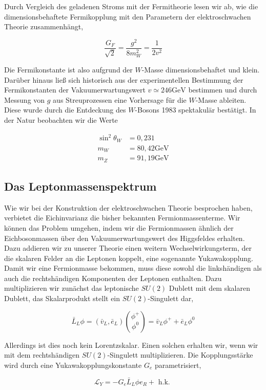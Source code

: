 \documentclass[10pt, letterpaper]{article}
\begin{document}
Durch Vergleich des geladenen Stroms mit der Fermitheorie lesen wir ab, wie die dimensionsbehaftete Fermikopplung mit den Parametern der elektroschwachen Theorie zusammenhängt,

$$
\frac{G_{F}}{\sqrt{2}}=\frac{g^{2}}{8 m_{W}^{2}}=\frac{1}{2 v^{2}}
$$

Die Fermikonstante ist also aufgrund der $W$-Masse dimensionsbehaftet und klein. Darüber hinaus ließ sich historisch aus der experimentellen Bestimmung der Fermikonstanten der Vakuumerwartungswert $v \simeq 246 \mathrm{GeV}$ bestimmen und durch Messung von $g$ aus Streuprozessen eine Vorhersage für die $W$-Masse ableiten. Diese wurde durch die Entdeckung des $W$-Bosons 1983 spektakulär bestätigt. In der Natur beobachten wir die Werte

$$
\begin{aligned}
\sin ^{2} \theta_{W} & =0,231 \\
m_{W} & =80,42 \mathrm{GeV} \\
m_{Z} & =91,19 \mathrm{GeV}
\end{aligned}
$$

\subsection*{Das Leptonmassenspektrum}
Wie wir bei der Konstruktion der elektroschwachen Theorie besprochen haben, verbietet die Eichinvarianz die bisher bekannten Fermionmassenterme. Wir können das Problem umgehen, indem wir die Fermionmassen ähnlich der Eichbosonmassen über den Vakuumerwartungswert des Higgsfeldes erhalten. Dazu addieren wir zu unserer Theorie einen weitern Wechselwirkungsterm, der die skalaren Felder an die Leptonen koppelt, eine sogenannte Yukawakopplung. Damit wir eine Fermionmasse bekommen, muss diese sowohl die linkshändigen als auch die rechtshändigen Komponenten der Leptonen enthalten. Dazu multiplizieren wir zunächst das leptonische $S U(2)$ Dublett mit dem skalaren Dublett, das Skalarprodukt stellt ein $S U(2)$-Singulett dar,

$$
\bar{L}_{L} \phi=\left(\bar{v}_{L}, \bar{e}_{L}\right)\binom{\phi^{+}}{\phi^{0}}=\bar{v}_{L} \phi^{+}+\bar{e}_{L} \phi^{0}
$$

Allerdings ist dies noch kein Lorentzskalar. Einen solchen erhalten wir, wenn wir mit dem rechtshändigen $S U(2)$-Singulett multiplizieren. Die Kopplungsstärke wird durch eine Yukawakopplungskonstante $G_{e}$ parametrisiert,

$$
\mathscr{L}_{Y}=-G_{e} \bar{L}_{L} \phi e_{R}+\text { h.k. }
$$
\end{document}
